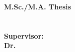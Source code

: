 

\newpage
{}%
\begin{center}
\begin{latin}
\doublespacing
\thispagestyle{empty}
\vspace*{4cm}{\hspace*{-8cm}}
{\FontEnc \bfseries   M.Sc./M.A. Thesis}\\[2cm]
{\hspace*{-1cm}}{\Fontd \bfseries \entitle}\\[2cm]
{\FontEnc\bfseries \enAuthor}\\[4.5cm]
{\FontEnc \bfseries Supervisor:}\\
{\FontEnc \bfseries Dr. }\\[2cm]
{\FontEnb \bfseries \enDep}
\\[2.7cm]{\hspace*{10cm}}
{\Fontc \bfseries {}}

\end{latin}
\end{center}

